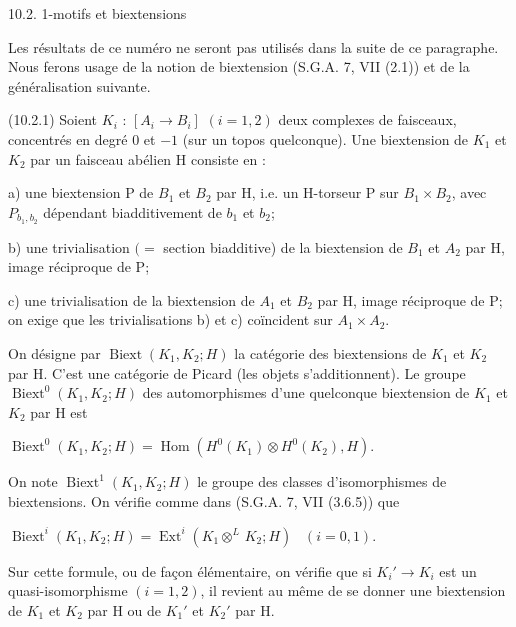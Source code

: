 \documentclass[11pt,twoside]{article}
\newcommand{\DFormula}[1]{%
  \par\smallskip\noindent\hspace*{0pt}\(\displaystyle #1\)\par\smallskip
}
\begin{document}
10.2. 1-motifs et biextensions\par
\par\medskip
Les résultats de ce numéro ne seront pas utilisés dans la suite de ce paragraphe. Nous ferons usage de la notion de biextension (S.G.A. 7, VII (2.1)) et de la généralisation suivante.\par
\par\medskip
(10.2.1) Soient \(K_{i}\) : \([A_{i}\to B_{i}]\) \((i=1,2)\) deux complexes de faisceaux, concentrés en degré 0 et \(−1\) (sur un topos quelconque). Une biextension de \(K_{1}\) et \(K_{2}\) par un faisceau abélien H consiste en :\par
\par\medskip
a) une biextension P de \(B_{1}\) et \(B_{2}\) par H, i.e. un H-torseur P sur \(B_{1}\times B_{2}\), avec \(P_{b_{1},b_{2}}\) dépendant biadditivement de \(b_{1}\) et \(b_{2}\);\par
b) une trivialisation \((=\) section biadditive) de la biextension de \(B_{1}\) et \(A_{2}\) par H, image réciproque de P;\par
c) une trivialisation de la biextension de \(A_{1}\) et \(B_{2}\) par H, image réciproque de P; on exige que les trivialisations b) et c) coïncident sur \(A_{1}\times A_{2}\).\par
\par\medskip
On désigne par \(\operatorname{Biext}(K_{1},K_{2};H)\) la catégorie des biextensions de \(K_{1}\) et \(K_{2}\) par H. C’est une catégorie de Picard (les objets s’additionnent). Le groupe \(\operatorname{Biext}^{0}(K_{1},K_{2};H)\) des automorphismes d’une quelconque biextension de \(K_{1}\) et \(K_{2}\) par H est\par
\par\medskip
\DFormula{\operatorname{Biext}^{0}(K_{1},K_{2};H)=\operatorname{Hom}(H^{0}(K_{1})\otimes H^{0}(K_{2}),H).}
\par\medskip
On note \(\operatorname{Biext}^{1}(K_{1},K_{2};H)\) le groupe des classes d’isomorphismes de biextensions. On vérifie comme dans (S.G.A. 7, VII (3.6.5)) que\par
\par\medskip
\DFormula{\operatorname{Biext}^{i}(K_{1},K_{2};H)=\operatorname{Ext}^{i}(K_{1}\otimes ^{L}\,K_{2};H)\,\,\,\,\,(i=0,1).}
\par\medskip
Sur cette formule, ou de façon élémentaire, on vérifie que si \(K_{i}′\to K_{i}\) est un quasi-isomorphisme \((i=1,2)\), il revient au même de se donner une biextension de \(K_{1}\) et \(K_{2}\) par H ou de \(K_{1}′\) et \(K_{2}′\) par H.\par
\end{document}
